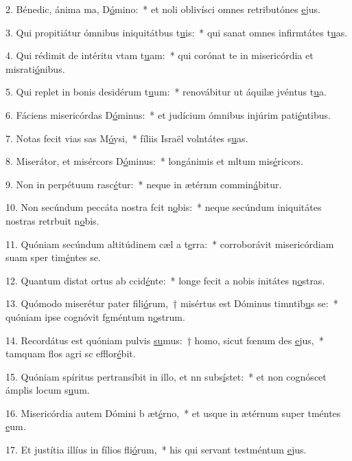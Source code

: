 2. Bénedic, ánima ma, D\uline{ó}mino:~* et noli oblivísci omnes retributónes \uline{e}jus.\par 
3. Qui propitiátur ómnibus iniquitátbus t\uline{u}is:~* qui sanat omnes infirmtátes t\uline{u}as.\par 
4. Qui rédimit de intéritu vtam t\uline{u}am:~* qui corónat te in misericórdia et misrati\uline{ó}nibus.\par 
5. Qui replet in bonis desidérum t\uline{u}um:~* renovábitur ut áquilæ jvéntus t\uline{u}a.\par 
6. Fáciens misericórdas D\uline{ó}minus:~* et judícium ómnibus injúrim pati\uline{é}ntibus.\par 
7. Notas fecit vias sas M\uline{ó}ysi,~* fíliis Israël volntátes s\uline{u}as.\par 
8. Miserátor, et misércors D\uline{ó}minus:~* longánimis et mltum mis\uline{é}ricors.\par 
9. Non in perpétuum rasc\uline{é}tur:~* neque in ætérnm commin\uline{á}bitur.\par 
10. Non secúndum peccáta nostra fcit n\uline{o}bis:~* neque secúndum iniquitátes nostras retrbuit n\uline{o}bis.\par 
11. Quóniam secúndum altitúdinem cæl a t\uline{e}rra:~* corroborávit misericórdiam suam sper tim\uline{é}ntes se.\par 
12. Quantum distat ortus ab ccid\uline{é}nte:~* longe fecit a nobis initátes n\uline{o}stras.\par 
13. Quómodo miserétur pater fili\uline{ó}rum,~† misértus est Dóminus timntib\uline{u}s se:~* quóniam ipse cognóvit fgméntum n\uline{o}strum.\par 
14. Recordátus est quóniam pulvis \uline{su}mus:~† homo, sicut fœnum des \uline{e}jus,~* tamquam flos agri sc efflor\uline{é}bit.\par 
15. Quóniam spíritus pertransíbit in illo, et nn subs\uline{í}stet:~* et non cognóscet ámplis locum s\uline{u}um.\par 
16. Misericórdia autem Dómini b æt\uline{é}rno,~* et usque in ætérnum super tméntes \uline{e}um.\par 
17. Et justítia illíus in fílios fli\uline{ó}rum,~* his qui servant testméntum \uline{e}jus.\par 
